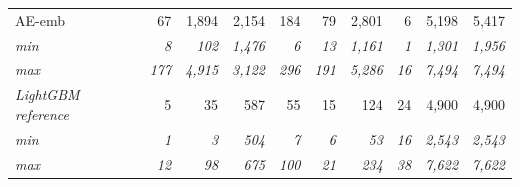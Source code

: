 \begin{table}[tbp]
\begin{tabular}{@{}lrrrrrrrrr@{}}
AE-emb & 67 & 1,894 & 2,154 & 184 & 79 & 2,801 & 6 & 5,198 & 5,417 \\
\quad\textit{min} & \textit{8} & \textit{102} & \textit{1,476} & \textit{6} & \textit{13} & \textit{1,161} & \textit{1} & \textit{1,301} & \textit{1,956} \\
\quad\textit{max} & \textit{177} & \textit{4,915} & \textit{3,122} & \textit{296} & \textit{191} & \textit{5,286} & \textit{16} & \textit{7,494} & \textit{7,494} \\
\addlinespace
\textit{LightGBM reference} & 5 & 35 & 587 & 55 & 15 & 124 & 24 & 4,900 & 4,900 \\
\quad\textit{min} & \textit{1} & \textit{3} & \textit{504} & \textit{7} & \textit{6} & \textit{53} & \textit{16} & \textit{2,543} & \textit{2,543} \\
\quad\textit{max} & \textit{12} & \textit{98} & \textit{675} & \textit{100} & \textit{21} & \textit{234} & \textit{38} & \textit{7,622} & \textit{7,622} \\
\bottomrule
\end{tabular}
\end{table}
